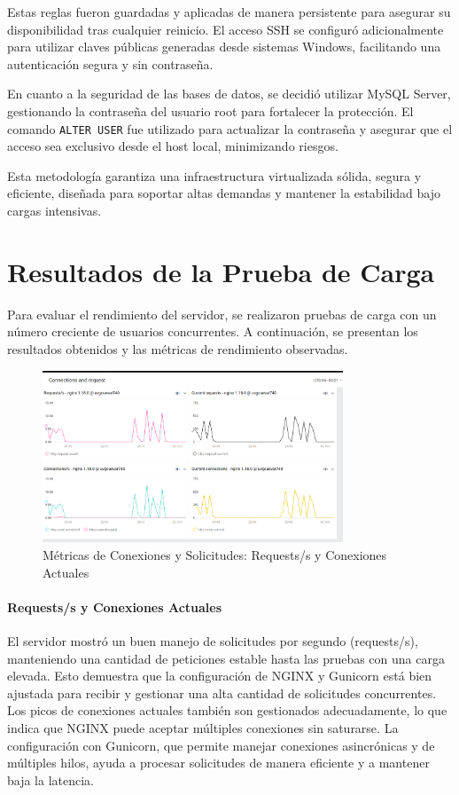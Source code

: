 Estas reglas fueron guardadas y aplicadas de manera persistente para asegurar su disponibilidad tras cualquier reinicio. El acceso SSH se configuró adicionalmente para utilizar claves públicas generadas desde sistemas Windows, facilitando una autenticación segura y sin contraseña.

En cuanto a la seguridad de las bases de datos, se decidió utilizar MySQL Server, gestionando la contraseña del usuario root para fortalecer la protección. El comando \texttt{ALTER USER} fue utilizado para actualizar la contraseña y asegurar que el acceso sea exclusivo desde el host local, minimizando riesgos.

Esta metodología garantiza una infraestructura virtualizada sólida, segura y eficiente, diseñada para soportar altas demandas y mantener la estabilidad bajo cargas intensivas.

\section{Resultados de la Prueba de Carga}

Para evaluar el rendimiento del servidor, se realizaron pruebas de carga con un número creciente de usuarios concurrentes. A continuación, se presentan los resultados obtenidos y las métricas de rendimiento observadas.

\begin{figure}[H]
    \centering
    \includegraphics[width=0.8\textwidth]{figuras/ConnectionsAndRequest.png}
    \caption{Métricas de Conexiones y Solicitudes: Requests/s y Conexiones Actuales}
    \label{fig:connectionsAndRequest}
\end{figure}

\paragraph{Requests/s y Conexiones Actuales}
El servidor mostró un buen manejo de solicitudes por segundo (requests/s), manteniendo una cantidad de peticiones estable hasta las pruebas con una carga elevada. Esto demuestra que la configuración de NGINX y Gunicorn está bien ajustada para recibir y gestionar una alta cantidad de solicitudes concurrentes. Los picos de conexiones actuales también son gestionados adecuadamente, lo que indica que NGINX puede aceptar múltiples conexiones sin saturarse. La configuración con Gunicorn, que permite manejar conexiones asincrónicas y de múltiples hilos, ayuda a procesar solicitudes de manera eficiente y a mantener baja la latencia.

